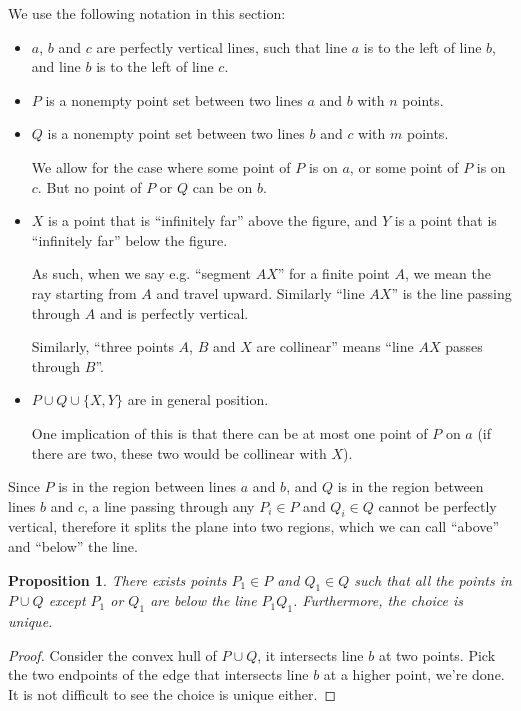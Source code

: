 \documentclass{article}
\theoremstyle{plain}
\newtheorem{proposition}         {Proposition}      [section]
\begin{document}
We use the following notation in this section:
\begin{itemize}
	\item $a$, $b$ and $c$ are perfectly vertical lines,
		such that line $a$ is to the left of line $b$, and line $b$ is to the left of line $c$.
	\item $P$ is a nonempty point set between two lines $a$ and $b$ with $n$ points.
	\item $Q$ is a nonempty point set between two lines $b$ and $c$ with $m$ points.

		We allow for the case where some point of $P$ is on $a$, or some point of $P$ is on $c$.
		But no point of $P$ or $Q$ can be on $b$.
	\item $X$ is a point that is ``infinitely far'' above the figure, and $Y$ is a point that is
		``infinitely far'' below the figure.

		As such, when we say e.g. ``segment $AX$'' for a finite point $A$, we mean
		the ray starting from $A$ and travel upward. Similarly ``line $AX$'' is the line
		passing through $A$ and is perfectly vertical.

		Similarly, ``three points $A$, $B$ and $X$ are collinear'' means ``line $AX$ passes through $B$''.

	\item $P \cup Q \cup \{ X, Y \}$ are in general position.

		One implication of this is that there can be at most one point of $P$ on $a$ (if there are two,
		these two would be collinear with $X$).
\end{itemize}

Since $P$ is in the region between lines $a$ and $b$,
and $Q$ is in the region between lines $b$ and $c$,
a line passing through any $P_i \in P$ and $Q_i \in Q$
cannot be perfectly vertical,
therefore it splits the plane into two regions, which we can call ``above'' and ``below'' the line.

\begin{proposition}
	\label{prop:upper_cap_prop}
	There exists points $P_1 \in P$ and $Q_1 \in Q$ such that
	all the points in $P \cup Q$ except $P_1$ or $Q_1$
	are below the line $P_1 Q_1$. Furthermore, the choice is unique.
\end{proposition}
\begin{proof}
	Consider the convex hull of $P \cup Q$, it intersects line $b$ at two points.
	Pick the two endpoints of the edge that intersects line $b$ at a higher point,
	we're done.
	It is not difficult to see the choice is unique either.
\end{proof}
\end{document}
